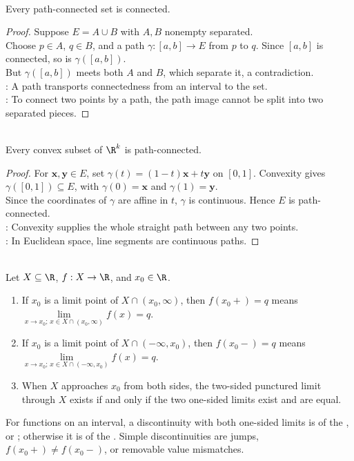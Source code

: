 \begin{theorem} \label{thm:path-connected-implies-connected} \\
Every path-connected set is connected.
\begin{proof}
Suppose $E=A\cup B$ with $A,B$ nonempty separated.\\
Choose $p\in A$, $q\in B$, and a path $\gamma:[a,b]\to E$ from $p$ to $q$. Since $[a,b]$ is connected, so is $\gamma([a,b])$.\\
But $\gamma([a,b])$ meets both $A$ and $B$, which separate it, a contradiction.\\
: A path transports connectedness from an interval to the set.\\
: To connect two points by a path, the path image cannot be split into two separated pieces.
\end{proof}
\end{theorem}

\begin{corollary} \label{cor:convex-sets-path-connected} \\
Every convex subset of $\R^k$ is path-connected.
\begin{proof}
For $\mathbf{x},\mathbf{y}\in E$, set $\gamma(t)=(1-t)\mathbf{x}+t\mathbf{y}$ on $[0,1]$. Convexity gives $\gamma([0,1])\subseteq E$, with $\gamma(0)=\mathbf{x}$ and $\gamma(1)=\mathbf{y}$.\\
Since the coordinates of $\gamma$ are affine in $t$, $\gamma$ is continuous. Hence $E$ is path-connected.\\
: Convexity supplies the whole straight path between any two points.\\
: In Euclidean space, line segments are continuous paths.
\end{proof}
\end{corollary}

\begin{definition} \label{def:one-sided-limits-and-discontinuities} \\
Let $X\subseteq\R$, $f:X\to\R$, and $x_0\in\R$.
\begin{enumerate}[label=(\roman*)]
\setlength{\itemsep}{0pt}
\item If $x_0$ is a limit point of $X\cap(x_0,\infty)$, then $f(x_0+)=q$ means $\lim\limits_{x\to x_0;\,x\in X\cap(x_0,\infty)}f(x)=q$.
\item If $x_0$ is a limit point of $X\cap(-\infty,x_0)$, then $f(x_0-)=q$ means $\lim\limits_{x\to x_0;\,x\in X\cap(-\infty,x_0)}f(x)=q$.
\item When $X$ approaches $x_0$ from both sides, the two-sided punctured limit through $X$ exists if and only if the two one-sided limits exist and are equal.
\end{enumerate}
For functions on an interval, a discontinuity with both one-sided limits is of the , or ; otherwise it is of the . Simple discontinuities are jumps, $f(x_0+)\neq f(x_0-)$, or removable value mismatches.
\end{definition}

